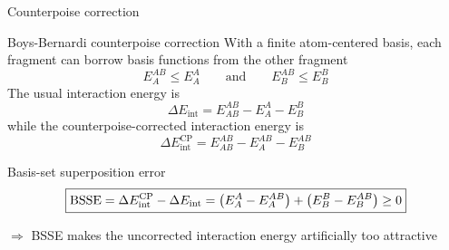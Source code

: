 \documentclass[aspectratio=169,9pt]{beamer}
\begin{document}
\begin{frame}{Counterpoise correction}
	\begin{block}{Boys-Bernardi counterpoise correction}
		With a finite atom-centered basis, each fragment can
		\alert{borrow basis functions from the other fragment}
		\begin{equation*}
			E_A^{AB} \leq E_A^A
			\qquad\text{and}\qquad
			E_B^{AB} \leq E_B^B
		\end{equation*}
		The usual interaction energy is
		\begin{equation*}
			\Delta E_\text{int}
			=
			E_{AB}^{AB} - E_A^A - E_B^B
		\end{equation*}
		while the counterpoise-corrected interaction energy is
		\begin{equation*}
			\boxed{
				\Delta E_\text{int}^\text{CP}
				=
				E_{AB}^{AB} - E_A^{AB} - E_B^{AB}
			}
		\end{equation*}
	\end{block}
	\vfill
	\begin{block}{Basis-set superposition error}
		\begin{equation*}
			\boxed{
				\text{BSSE}
				=
				\Delta E_\text{int}^\text{CP}
				-
				\Delta E_\text{int}
				=
				\qty(E_A^A-E_A^{AB})
				+
				\qty(E_B^B-E_B^{AB})
				\geq 0
			}
		\end{equation*}
	\end{block}
	\vfill
	\centering
	$\Rightarrow$
	\alert{BSSE makes the uncorrected interaction energy artificially too attractive}
\end{frame}
\end{document}

